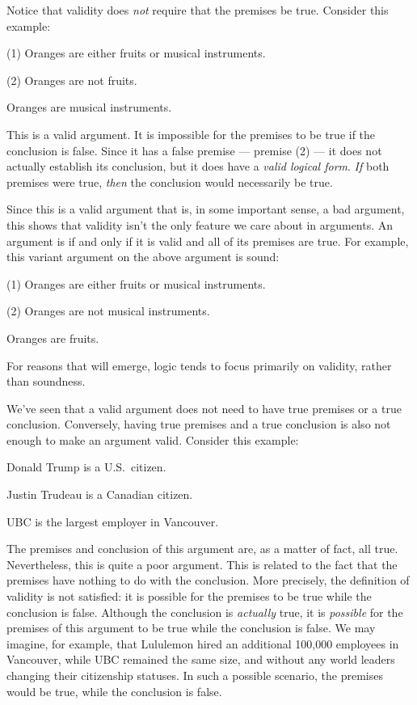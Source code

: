 Notice that validity does \emph{not} require that the premises be true. Consider this example:

\begin{earg}
\item[(1)] Oranges are either fruits or musical instruments.
\item[(2)] Oranges are not fruits.
\item[\therefore] Oranges are musical instruments.
\end{earg}

This is a valid argument. It is impossible for the premises to be true if the conclusion is false. Since it has a false premise --- premise (2) --- it does not actually establish its conclusion, but it does have a \emph{valid logical form}. \emph{If} both premises were true, \emph{then} the conclusion would necessarily be true.

Since this is a valid argument that is, in some important sense, a bad argument, this shows that validity isn't the only feature we care about in arguments. An argument is  if and only if it is valid and all of its premises are true. For example, this variant argument on the above argument is sound:

\begin{earg}
\item[(1)] Oranges are either fruits or musical instruments.
\item[(2)] Oranges are not musical instruments.
\item[\therefore] Oranges are fruits.
\end{earg}

 For reasons that will emerge, logic tends to focus primarily on validity, rather than soundness.

We've seen that a valid argument does not need to have true premises or a true conclusion. Conversely, having true premises and a true conclusion is also not enough to make an argument valid. Consider this example:

\begin{earg}
\item[] Donald Trump is a U.S.\ citizen.
\item[] Justin Trudeau is a Canadian citizen.
\item[\therefore] UBC is the largest employer in Vancouver.
\end{earg}

The premises and conclusion of this argument are, as a matter of fact, all true. Nevertheless, this is quite a poor argument. This is related to the fact that the premises have nothing to do with the conclusion. More precisely, the definition of validity is not satisfied: it is possible for the premises to be true while the conclusion is false. Although the conclusion is \emph{actually} true, it is \emph{possible} for the premises of this argument to be true while the conclusion is false. We may imagine, for example, that Lululemon hired an additional 100,000 employees in Vancouver, while UBC remained the same size, and without any world leaders changing their citizenship statuses. In such a possible scenario, the premises would be true, while the conclusion is false.


